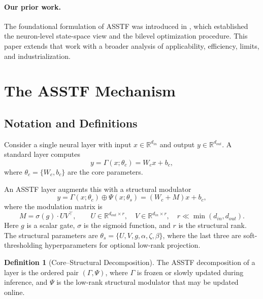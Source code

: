 \documentclass[11pt,a4paper]{article}
\theoremstyle{definition}
\newtheorem{definition}{Definition}[section]
\begin{document}
\paragraph{Our prior work.} The foundational formulation of ASSTF was introduced in \cite{lin2025asstf}, which established the neuron-level state-space view and the bilevel optimization procedure. This paper extends that work with a broader analysis of applicability, efficiency, limits, and industrialization.

\section{The ASSTF Mechanism}
\label{sec:mechanism}

\subsection{Notation and Definitions}
\label{subsec:notation}

Consider a single neural layer with input $x \in \mathbb{R}^{d_{in}}$ and output $y \in \mathbb{R}^{d_{out}}$. A standard layer computes
\begin{equation}
    y = \Gamma(x; \theta_c) = W_c x + b_c,
\end{equation}
where $\theta_c = \{W_c, b_c\}$ are the core parameters.

An ASSTF layer augments this with a structural modulator
\begin{equation}
    \label{eq:asstf_linear}
    y = \Gamma(x; \theta_c) \oplus \Psi(x; \theta_s)
    = (W_c + M) x + b_c,
\end{equation}
where the modulation matrix is
\begin{equation}
    M = \sigma(g) \cdot U V^{\top},
    \qquad
    U \in \mathbb{R}^{d_{out} \times r},
    \quad
    V \in \mathbb{R}^{d_{in} \times r},
    \quad
    r \ll \min(d_{in}, d_{out}).
\end{equation}
Here $g$ is a scalar gate, $\sigma$ is the sigmoid function, and $r$ is the structural rank. The structural parameters are $\theta_s = \{U, V, g, \alpha, \zeta, \beta\}$, where the last three are soft-thresholding hyperparameters for optional low-rank projection.

\begin{definition}[Core--Structural Decomposition]
    The ASSTF decomposition of a layer is the ordered pair $(\Gamma, \Psi)$, where $\Gamma$ is frozen or slowly updated during inference, and $\Psi$ is the low-rank structural modulator that may be updated online.
\end{definition}
\end{document}
